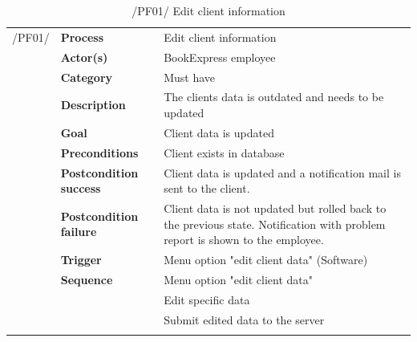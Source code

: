 \documentclass[11pt,a4paper,oneside,svgnames]{report}
\begin{document}
\begin{table}[H]
\centering
\begin{tabular}{p{1.5cm}p{3cm}p{8cm}}
\cellcolor{white}/PF01/	& \textbf{Process} & Edit client information\\
\cellcolor{white}		& \textbf{Actor(s)} & BookExpress employee\\
\cellcolor{white}		& \textbf{Category} & Must have\\
\cellcolor{white}		& \textbf{Description}	 & The clients data is outdated and needs to be updated\\
\cellcolor{white}		& \textbf{Goal} & Client data is updated\\
\cellcolor{white}		& \textbf{Preconditions} & Client exists in database\\
\cellcolor{white}		& \textbf{Postcondition success} & Client data is updated and a notification mail is sent to the client.\\
\cellcolor{white}		& \textbf{Postcondition failure} & Client data is not updated but rolled back to the previous state. Notification with problem report is shown to the employee.\\
\cellcolor{white}		& \textbf{Trigger} & Menu option "edit client data" (Software)\\
\cellcolor{white}		& \textbf{Sequence} & Menu option "edit client data"\\
\cellcolor{white}		& & Edit specific data\\
\cellcolor{white}		& & Submit edited data to the server\\
\cellcolor{white}\hfill \\
\end{tabular}
\caption{/PF01/ Edit client information}
\label{tab:pf01}
\end{table}
\end{document}
